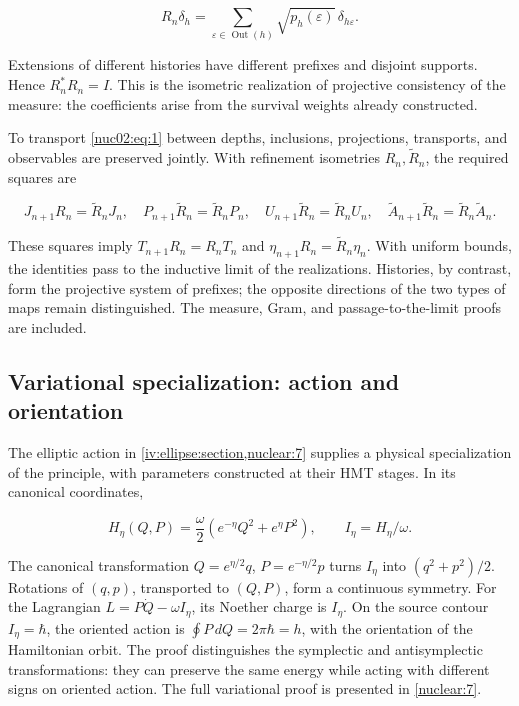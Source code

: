 \[
R_n\delta_h=\sum_{\varepsilon\in\operatorname{Out}(h)}
\sqrt{p_h(\varepsilon)}\,\delta_{h\varepsilon}.
\]

Extensions of different histories have different prefixes and disjoint supports. Hence \(R_n^*R_n=I\). This is the isometric realization of projective consistency of the measure: the coefficients arise from the survival weights already constructed.

To transport \eqref{nuc02:eq:1} between depths, inclusions, projections, transports, and observables are preserved jointly. With refinement isometries \(R_n,\widetilde R_n\), the required squares are

\[
J_{n+1}R_n=\widetilde R_nJ_n,\quad
P_{n+1}\widetilde R_n=\widetilde R_nP_n,\quad
U_{n+1}\widetilde R_n=\widetilde R_nU_n,\quad
\widetilde A_{n+1}\widetilde R_n=\widetilde R_n\widetilde A_n.
\]

These squares imply \(T_{n+1}R_n=R_nT_n\) and \(\eta_{n+1}R_n=\widetilde R_n\eta_n\). With uniform bounds, the identities pass to the inductive limit of the realizations. Histories, by contrast, form the projective system of prefixes; the opposite directions of the two types of maps remain distinguished. The measure, Gram, and passage-to-the-limit proofs are included.

\subsection{Variational specialization: action and orientation}

The elliptic action in \cref{iv:ellipse:section,nuclear:7} supplies a physical specialization of the principle, with parameters constructed at their HMT stages. In its canonical coordinates,

\[
H_\eta(Q,P)=\frac{\omega}{2}
\left(e^{-\eta}Q^2+e^\eta P^2\right),\qquad
I_\eta=H_\eta/\omega.
\]

The canonical transformation \(Q=e^{\eta/2}q\), \(P=e^{-\eta/2}p\) turns \(I_\eta\) into \((q^2+p^2)/2\). Rotations of \((q,p)\), transported to \((Q,P)\), form a continuous symmetry. For the Lagrangian \(L=P\dot Q-\omega I_\eta\), its Noether charge is \(I_\eta\). On the source contour \(I_\eta=\hbar\), the oriented action is \(\oint P\,dQ=2\pi\hbar=h\), with the orientation of the Hamiltonian orbit. The proof distinguishes the symplectic and antisymplectic transformations: they can preserve the same energy while acting with different signs on oriented action. The full variational proof is presented in \cref{nuclear:7}.


